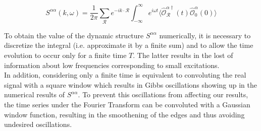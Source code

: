 \begin{equation}
    S^{\alpha\alpha}(k,\omega) = \frac{1}{2\pi} \sum_\mathcal{R} e^{-i k\cdot \mathcal{R}} \int_{-\infty}^{\infty} e^{i\omega t} \langle \mathcal{\hat{O}^{\alpha \dagger}_{\mathcal{R}}}(t) \mathcal{\hat{O}}^{\alpha}_0(0) \rangle
\end{equation}

To obtain the value of the dynamic structure $S^{\alpha\alpha}$ numerically, it is necessary to discretize the integral (i.e. approximate it by a finite sum) and to allow the time evolution to occur only for a finite time $T$.
The latter results in the lost of information about low frequencies corresponding to small excitations. \\

In addition, considering only a finite time is equivalent to convoluting the real signal with a square window which results in Gibbs oscillations showing up in the numerical results of $S^{\alpha \alpha}$.
To prevent this oscillations from affecting our results, the time series under the Fourier Transform can be convoluted with a Gaussian window function, resulting in the smoothening of the edges and thus avoiding undesired oscillations. 

